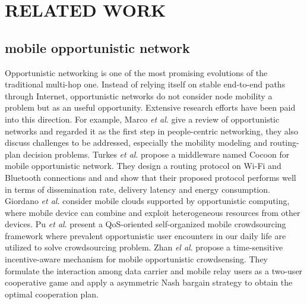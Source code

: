 \documentclass[journal]{IEEEtran}
\begin{document}



\section{RELATED WORK}

\subsection{mobile opportunistic network}
Opportunistic networking is one of the most promising evolutions of the traditional multi-hop one. 
Instead of relying itself on stable end-to-end paths through Internet, opportunistic networks do not consider node mobility a problem but as an useful opportunity. 
Extensive research efforts have been paid into this direction. For example, Marco \emph{et al}. \cite{Conti2014} give a review of opportunistic networks and regarded it as the first step in people-centric networking, they also discuss challenges to be addressed, especially the mobility modeling and routing-plan decision problems.
Turkes \emph{et al}. \cite{turkes2016cocoon} propose a middleware named Cocoon for mobile opportunistic network. They design a routing protocol on Wi-Fi and Bluetooth connections and and show that their proposed protocol performs well in terms of dissemination rate, delivery latency and energy consumption.
Giordano \emph{et al}. \cite{giordano2011human} consider mobile clouds supported by opportunistic computing, where mobile device can combine and exploit heterogeneous resources from other devices.
Pu \emph{et al}. \cite{Pu2017crowd} present a QoS-oriented self-organized mobile crowdsourcing framework where prevalent opportunistic user encounters in our daily life are utilized to solve crowdsourcing problem.
Zhan \emph{el al}. \cite{zhan2017time} propose a time-sensitive incentive-aware mechanism for mobile opportunistic crowdsensing. They formulate the interaction among data carrier and mobile relay users as a two-user cooperative game and apply a asymmetric Nash bargain strategy to obtain the optimal cooperation plan.
\end{document}
